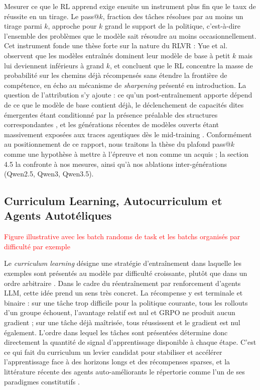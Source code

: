 \documentclass[11pt,a4paper]{article}
\begin{document}
Mesurer ce que le RL apprend exige ensuite un instrument plus fin que le taux de réussite en un tirage. Le pass@$k$, fraction des tâches résolues par au moins un tirage parmi $k$, approche pour $k$ grand le support de la politique, c'est-à-dire l'ensemble des problèmes que le modèle sait résoudre au moins occasionnellement. Cet instrument fonde une thèse forte sur la nature du RLVR : Yue et al. \cite{yue2025rlvr} observent que les modèles entraînés dominent leur modèle de base à petit $k$ mais lui deviennent inférieurs à grand $k$, et concluent que le RL concentre la masse de probabilité sur les chemins déjà récompensés sans étendre la frontière de compétence, en écho au mécanisme de \emph{sharpening} \cite{huang2024self} présenté en introduction. La question de l'attribution s'y ajoute : ce qu'un post-entraînement apporte dépend de ce que le modèle de base contient déjà, le déclenchement de capacités dites émergentes étant conditionné par la présence préalable des structures correspondantes \cite{liu2025drgrpo}, et les générations récentes de modèles ouverts étant massivement exposées aux traces agentiques dès le mid-training \cite{qwen3coder2025, kimik2_2025}. Conformément au positionnement de ce rapport, nous traitons la thèse du plafond pass@$k$ comme une hypothèse à mettre à l'épreuve et non comme un acquis ; la section 4.5 la confronte à nos mesures, ainsi qu'à nos ablations inter-générations (Qwen2.5, Qwen3, Qwen3.5).

\subsection{Curriculum Learning, Autocurriculum et Agents Autotéliques}

\textcolor{red}{Figure illustrative avec les batch randoms de task et les batchs organisés par difficulté par exemple}

Le \emph{curriculum learning} désigne une stratégie d'entraînement dans laquelle les exemples sont présentés au modèle par difficulté croissante, plutôt que dans un ordre arbitraire \cite{bengio2009curriculum}. Dans le cadre du réentraînement par renforcement d'agents LLM, cette idée prend un sens très concret. La récompense y est terminale et binaire : sur une tâche trop difficile pour la politique courante, tous les rollouts d'un groupe échouent, l'avantage relatif est nul et GRPO ne produit aucun gradient ; sur une tâche déjà maîtrisée, tous réussissent et le gradient est nul également. L'ordre dans lequel les tâches sont présentées détermine donc directement la quantité de signal d'apprentissage disponible à chaque étape. C'est ce qui fait du curriculum un levier candidat pour stabiliser et accélérer l'apprentissage face à des horizons longs et des récompenses sparses, et la littérature récente des agents auto-améliorants le répertorie comme l'un de ses paradigmes constitutifs \cite{gao2025selfevolving}.
\end{document}
